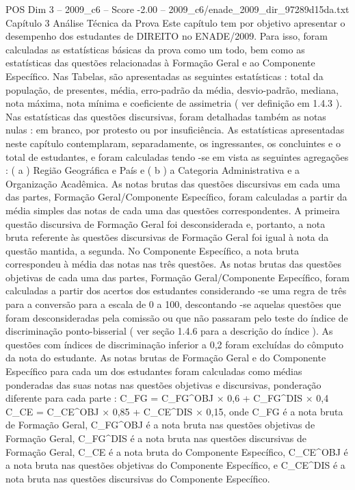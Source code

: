 \begin{textsample}{POS Dim 3 – 2009\_c6 – Score -2.00 – 2009\_c6/enade\_2009\_dir\_97289d15da.txt}  \label{ex:f3_pos_239}
Capítulo 3 Análise Técnica da Prova Este capítulo tem por objetivo apresentar o desempenho dos estudantes de DIREITO no ENADE/2009.
Para isso, foram calculadas as estatísticas básicas da prova como um todo, bem como as estatísticas das questões relacionadas à Formação Geral e ao Componente Específico.
Nas Tabelas, são apresentadas as seguintes estatísticas : total da população, de presentes, média, erro-padrão da média, desvio-padrão, mediana, nota máxima, nota mínima e coeficiente de assimetria ( ver definição em 1.4.3 ).
Nas estatísticas das questões discursivas, foram detalhadas também as notas nulas : em branco, por protesto ou por insuficiência.
As estatísticas apresentadas neste capítulo contemplaram, separadamente, os ingressantes, os concluintes e o total de estudantes, e foram calculadas tendo -se em vista as seguintes agregações : ( a ) Região Geográfica e País e ( b ) a Categoria Administrativa e a Organização Acadêmica.
As notas brutas das questões discursivas em cada uma das partes, Formação Geral/Componente Específico, foram calculadas a partir da média simples das notas de cada uma das questões correspondentes.
A primeira questão discursiva de Formação Geral foi desconsiderada e, portanto, a nota bruta referente às questões discursivas de Formação Geral foi igual à nota da questão mantida, a segunda.
No Componente Específico, a nota bruta correspondeu à média das notas nas três questões.
As notas brutas das questões objetivas de cada uma das partes, Formação Geral/Componente Específico, foram calculadas a partir dos acertos dos estudantes considerando -se uma regra de três para a conversão para a escala de 0 a 100, descontando -se aquelas questões que foram desconsideradas pela comissão ou que não passaram pelo teste do índice de discriminação ponto-bisserial ( ver seção 1.4.6 para a descrição do índice ).
As questões com índices de discriminação inferior a 0,2 foram excluídas do cômputo da nota do estudante.
As notas brutas de Formação Geral e do Componente Específico para cada um dos estudantes foram calculadas como médias ponderadas das suas notas nas questões objetivas e discursivas, ponderação diferente para cada parte : C\_FG = C\_FG\textasciicircum{}OBJ × 0,6 + C\_FG\textasciicircum{}DIS × 0,4 C\_CE = C\_CE\textasciicircum{}OBJ × 0,85 + C\_CE\textasciicircum{}DIS × 0,15, onde C\_FG é a nota bruta de Formação Geral, C\_FG\textasciicircum{}OBJ é a nota bruta nas questões objetivas de Formação Geral, C\_FG\textasciicircum{}DIS é a nota bruta nas questões discursivas de Formação Geral, C\_CE é a nota bruta do Componente Específico, C\_CE\textasciicircum{}OBJ é a nota bruta nas questões objetivas do Componente Específico, e C\_CE\textasciicircum{}DIS é a nota bruta nas questões discursivas do Componente Específico.

\end{textsample}

